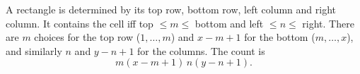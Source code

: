 A rectangle is determined by its top row, bottom row, left column and right column. It contains the cell iff top $\le m\le$ bottom and left $\le n\le$ right. There are $m$ choices for the top row ($1,\dots,m$) and $x-m+1$ for the bottom ($m,\dots,x$), and similarly $n$ and $y-n+1$ for the columns. The count is
\[\boxed{m(x-m+1)\,n(y-n+1)}.\]
